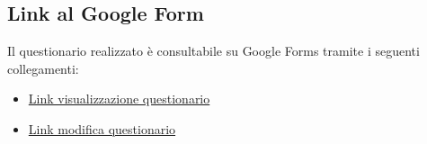 \subsection{Link al Google Form}
Il questionario realizzato è consultabile su Google Forms tramite i seguenti collegamenti:
\begin{itemize}
    \item \href{https://docs.google.com/forms/d/e/1FAIpQLSffQU5PqOGo93X0QrQbD5VscMGA07pes3RWkuZRolinX4nevg/viewform}{Link visualizzazione questionario}
    \item \href{https://docs.google.com/forms/u/1/d/1vKzFGCQb5nvyG6it8HfEqZgZ3ioQ6J1_T6eUiTdYIRc/edit?usp=redirect_edit_quantum}{Link modifica questionario}
\end{itemize}